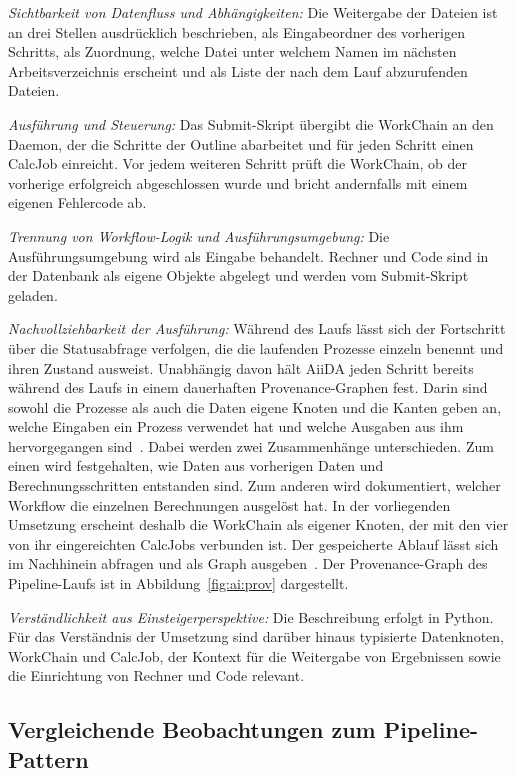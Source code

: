 \emph{Sichtbarkeit von Datenfluss und Abhängigkeiten:} Die Weitergabe
der Dateien ist an drei Stellen ausdrücklich beschrieben, als
Eingabeordner des vorherigen Schritts, als Zuordnung, welche Datei
unter welchem Namen im nächsten Arbeitsverzeichnis erscheint und als
Liste der nach dem Lauf abzurufenden Dateien.

\emph{Ausführung und Steuerung:} Das Submit-Skript übergibt die
WorkChain an den Daemon, der die Schritte der Outline abarbeitet und
für jeden Schritt einen CalcJob einreicht. Vor jedem weiteren Schritt
prüft die WorkChain, ob der vorherige erfolgreich abgeschlossen
wurde und bricht andernfalls mit einem eigenen Fehlercode ab.

\emph{Trennung von Workflow-Logik und Ausführungsumgebung:} Die
Ausführungsumgebung wird als Eingabe behandelt. Rechner und Code sind
in der Datenbank als eigene Objekte abgelegt und werden vom
Submit-Skript geladen.


\emph{Nachvollziehbarkeit der Ausführung:} Während des Laufs lässt
sich der Fortschritt über die Statusabfrage verfolgen, die die
laufenden Prozesse einzeln benennt und ihren Zustand ausweist. Unabhängig davon hält AiiDA jeden Schritt bereits während des Laufs in einem dauerhaften
Provenance-Graphen fest. Darin sind sowohl die Prozesse als auch die
Daten eigene Knoten und die Kanten geben an, welche Eingaben ein
Prozess verwendet hat und welche Ausgaben aus ihm hervorgegangen
sind~\cite[S.~7\,f.]{huber2020aiida}. Dabei werden zwei Zusammenhänge unterschieden. Zum einen wird festgehalten, wie Daten aus vorherigen Daten und Berechnungsschritten entstanden sind. Zum anderen wird dokumentiert, welcher Workflow die einzelnen Berechnungen ausgelöst hat. In der vorliegenden Umsetzung erscheint deshalb die WorkChain als
eigener Knoten, der mit den vier von ihr eingereichten CalcJobs
verbunden ist. Der gespeicherte Ablauf lässt sich im
Nachhinein abfragen und als Graph ausgeben~\cite{aiidadocs-graph}. Der
Provenance-Graph des Pipeline-Laufs ist in
Abbildung~\ref{fig:ai:prov} dargestellt.

\emph{Verständlichkeit aus Einsteigerperspektive:} Die Beschreibung
erfolgt in Python. Für das Verständnis der Umsetzung sind darüber
hinaus typisierte Datenknoten, WorkChain und CalcJob, der Kontext für
die Weitergabe von Ergebnissen sowie die Einrichtung von Rechner und
Code relevant.

\subsection{Vergleichende Beobachtungen zum Pipeline-Pattern}
\label{sec:lokal:pipeline:zusammenfassung}

